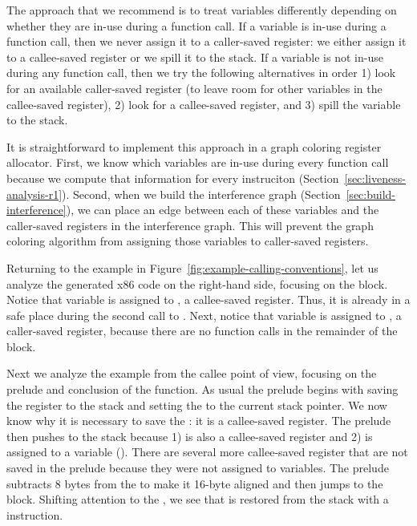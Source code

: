 \documentclass[11pt]{book}
\begin{document}
The approach that we recommend is to treat variables differently
depending on whether they are in-use during a function call.  If a
variable is in-use during a function call, then we never assign it to
a caller-saved register: we either assign it to a callee-saved
register or we spill it to the stack. If a variable is not in-use
during any function call, then we try the following alternatives in
order 1) look for an available caller-saved register (to leave room
for other variables in the callee-saved register), 2) look for a
callee-saved register, and 3) spill the variable to the stack.

It is straightforward to implement this approach in a graph coloring
register allocator. First, we know which variables are in-use during
every function call because we compute that information for every
instruciton (Section~\ref{sec:liveness-analysis-r1}). Second, when we
build the interference graph (Section~\ref{sec:build-interference}),
we can place an edge between each of these variables and the
caller-saved registers in the interference graph. This will prevent
the graph coloring algorithm from assigning those variables to
caller-saved registers.

Returning to the example in
Figure~\ref{fig:example-calling-conventions}, let us analyze the
generated x86 code on the right-hand side, focusing on the
 block. Notice that variable  is assigned to
, a callee-saved register. Thus, it is already in a safe
place during the second call to . Next, notice that
variable  is assigned to , a caller-saved register,
because there are no function calls in the remainder of the block.

Next we analyze the example from the callee point of view, focusing on
the prelude and conclusion of the  function. As usual the
prelude begins with saving the  register to the stack and
setting the  to the current stack pointer. We now know why
it is necessary to save the : it is a callee-saved register.
The prelude then pushes  to the stack because 1) 
is also a callee-saved register and 2)  is assigned to a
variable (). There are several more callee-saved register that
are not saved in the prelude because they were not assigned to
variables. The prelude subtracts 8 bytes from the  to make
it 16-byte aligned and then jumps to the  block. Shifting
attention to the , we see that  is restored
from the stack with a  instruction.
\end{document}
